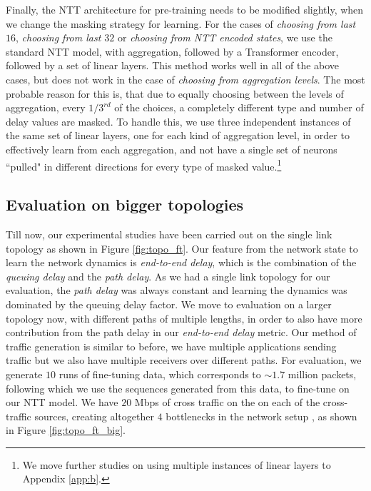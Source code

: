 Finally, the NTT architecture for pre-training needs to be modified slightly, when we change the masking strategy for learning. For the cases of \emph{choosing from last $16$}, \emph{choosing from last $32$} or \emph{choosing from NTT encoded states}, we use the standard NTT model, with aggregation, followed by a Transformer encoder, followed by a set of linear layers. This method works well in all of the above cases, but does not work in the case of \emph{choosing from aggregation levels}. The most probable reason for this is, that due to equally choosing between the levels of aggregation, every $1/3^{rd}$ of the choices, a completely different type and number of delay values are masked. To handle this, we use three independent instances of the same set of linear layers, one for each kind of aggregation level, in order to effectively learn from each aggregation, and not have a single set of neurons ``pulled" in different directions for every type of masked value.\footnote{We move further studies on using multiple instances of linear layers to Appendix \ref{app:b}.}


\subsection{Evaluation on bigger topologies}
\label{ssec:comptop}

Till now, our experimental studies have been carried out on the single link topology as shown in Figure \ref{fig:topo_ft}. Our feature from the network state to learn the network dynamics is \emph{end-to-end delay}, which is the combination of the \emph{queuing delay} and the \emph{path delay}. As we had a single link topology for our evaluation, the \emph{path delay} was always constant and learning the dynamics was dominated by the queuing delay factor. We move to evaluation on a larger topology now, with different paths of multiple lengths, in order to also have more contribution from the path delay in our \emph{end-to-end delay} metric. Our method of traffic generation is similar to before, we have multiple applications sending traffic but we also have multiple receivers over different paths. For evaluation, we generate $10$ runs of fine-tuning data, which corresponds to ${\sim}1.7$ million packets, following which we use the sequences generated from this data, to fine-tune on our NTT model. We have $20$ Mbps of cross traffic on the on each of the cross-traffic sources, creating altogether $4$ bottlenecks in the network setup , as shown in Figure \ref {fig:topo_ft_big}.

